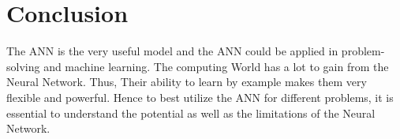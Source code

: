 \documentclass[a4paper, 12pt]{article}
\begin{document}
			
			





\section*{Conclusion}
The ANN is the very useful model and the ANN could be applied in problem-solving and machine learning. The computing World has a lot to gain from the Neural Network. Thus, Their ability to learn by example makes them very flexible and powerful. Hence to best utilize the ANN for different problems, it is essential to understand the potential as well as the limitations of the Neural Network.




\end{document}
